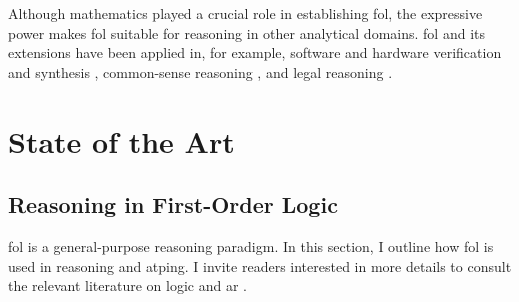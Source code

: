 Although mathematics played a crucial role in establishing \gls{fol},
the expressive power makes \gls{fol} suitable for reasoning in other analytical domains.
\Gls{fol} and its extensions have been applied in, for example, software and hardware verification and synthesis
\cite{
DBLP:journals/tcad/DSilvaKW08, %
DBLP:series/lncs/10001}, %
common-sense reasoning \cite{DBLP:conf/cade/PeaseS07}, and
legal reasoning \cite{DBLP:journals/logcom/PrakkenWBA15,
DBLP:conf/atal/LibalN21}.

\section{State of the Art}
\label{sec:sota}

\subsection{Reasoning in First-Order Logic}


\Gls{fol} is a general-purpose reasoning paradigm.
In this section, I outline how \gls{fol} is used in reasoning
and \gls{atping}.
I invite readers interested in more details to consult the relevant literature on \gls{logic} \cite{DBLP:books/daglib/0072413,DBLP:books/daglib/0082098} and \gls{ar} \cite{DBLP:books/daglib/0022394,DBLP:books/el/RobinsonV01}.

